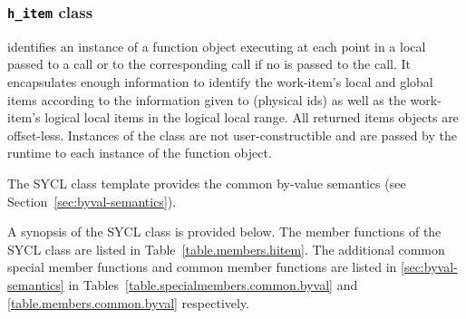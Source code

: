 
\subsubsection{\texttt{h_item} class}
\label{hitem-class}

 identifies an instance of a  function object
executing at each point in a local  passed to a 
call or to the corresponding  call if no 
is passed to the  call.
It encapsulates enough information to identify the \gls{work-item}'s local and global \glspl{item}
according to the information given to  (physical ids)
as well as the \gls{work-item}'s logical local \glspl{item} in the logical local range.
All returned \glspl{item} objects are offset-less.
Instances of the  class are not
user-constructible and are passed by the runtime to each instance of the
function object.

The SYCL  class template provides the common by-value
semantics (see Section~\ref{sec:byval-semantics}).

A synopsis of the SYCL  class is provided below. The member functions of the SYCL  class are listed in Table~\ref{table.members.hitem}. The additional common special member functions and common member functions are listed in \ref{sec:byval-semantics} in Tables~\ref{table.specialmembers.common.byval} and \ref{table.members.common.byval} respectively.



